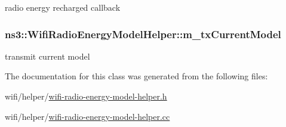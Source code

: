 radio energy recharged callback 

\subsubsection[{\texorpdfstring{m\+\_\+tx\+Current\+Model}{m_txCurrentModel}}]{ ns3\+::\+Wifi\+Radio\+Energy\+Model\+Helper\+::m\+\_\+tx\+Current\+Model\hspace{0.3cm}{\ttfamily [private]}}\hypertarget{classns3_1_1WifiRadioEnergyModelHelper_adbd381edb03c4b897d94090410c378b6}{}\label{classns3_1_1WifiRadioEnergyModelHelper_adbd381edb03c4b897d94090410c378b6}


transmit current model 



The documentation for this class was generated from the following files\+:\begin{DoxyCompactItemize}
\item 
wifi/helper/\hyperlink{wifi-radio-energy-model-helper_8h}{wifi-\/radio-\/energy-\/model-\/helper.\+h}\item 
wifi/helper/\hyperlink{wifi-radio-energy-model-helper_8cc}{wifi-\/radio-\/energy-\/model-\/helper.\+cc}\end{DoxyCompactItemize}
